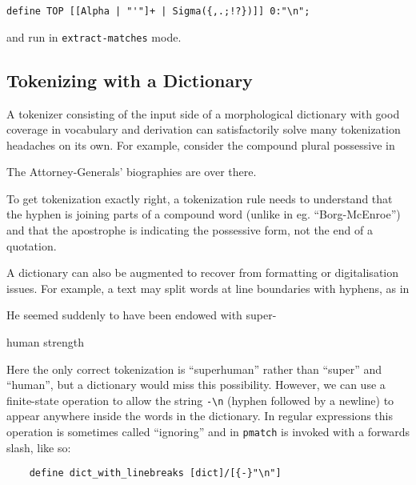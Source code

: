 \documentclass{llncs}
\begin{document}
\begin{verbatim}
define TOP [[Alpha | "'"]+ | Sigma({,.;!?})]] 0:"\n";
\end{verbatim}

and run in \verb+extract-matches+ mode.

\subsection{Tokenizing with a Dictionary}

A tokenizer consisting of the input side of a morphological dictionary
with good coverage in vocabulary and derivation can satisfactorily solve
many tokenization headaches on its own. For example, consider the compound
plural possessive in

\begin{exe}
  \item The Attorney-Generals' biographies are over there.
\end{exe}

To get tokenization exactly right, a tokenization rule needs to understand that
the hyphen is joining parts of a compound word (unlike in eg.
``Borg-McEnroe'') and that the apostrophe is indicating the possessive form,
not the end of a quotation.

A dictionary can also be augmented to recover from
formatting or digitalisation issues. For example, a text may split words
at line boundaries with hyphens, as in

\begin{exe}
\item He seemed suddenly to have been endowed with super-

  human strength
\end{exe}

Here the only correct tokenization is ``superhuman'' rather than ``super''
and ``human'', but a dictionary would miss this possibility. However,
we can use a finite-state operation to allow the string \verb+-\n+ (hyphen
followed by a newline) to appear anywhere inside the words in the dictionary.
In regular expressions this operation is sometimes called ``ignoring'' and in
\verb+pmatch+ is invoked with a forwards slash, like so:

\begin{center}
  \begin{framed}
\begin{verbatim}
    define dict_with_linebreaks [dict]/[{-}"\n"]
\end{verbatim}
  \end{framed}
\end{center}
\end{document}
